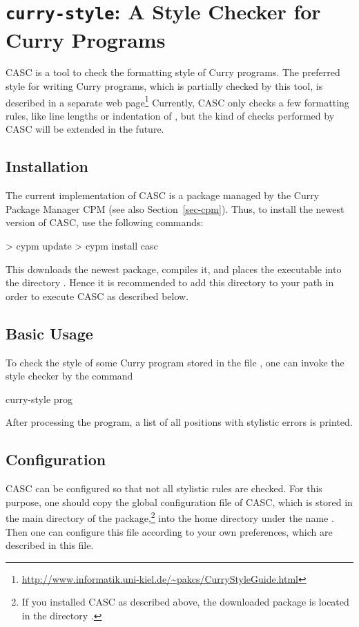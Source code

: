 \section{\texttt{curry-style}: A Style Checker for Curry Programs}
\label{sec-casc}

CASC
is a tool to check the formatting style of Curry programs.
The preferred style for writing Curry programs,
which is partially checked by this tool,
is described in a separate web page\footnote{%
\url{http://www.informatik.uni-kiel.de/~pakcs/CurryStyleGuide.html}}
Currently, CASC only checks a few formatting rules, like
line lengths or
indentation of , but the kind of checks
performed by CASC will be extended in the future.

\subsection{Installation}

The current implementation of CASC is a package
managed by the Curry Package Manager CPM
(see also Section~\ref{sec-cpm}).
Thus, to install the newest version of CASC, use the following commands:
%
\begin{curry}
> cypm update
> cypm install casc
\end{curry}
%
This downloads the newest package, compiles it, and places
the executable  into the directory .
Hence it is recommended to add this directory to your path
in order to execute CASC as described below.

\subsection{Basic Usage}

To check the style of some Curry program stored
in the file ,
one can invoke the style checker by
the command
%
\begin{curry}
curry-style prog
\end{curry}
%
After processing the program, a list of all positions
with stylistic errors is printed.


\subsection{Configuration}

CASC can be configured so that not all stylistic rules are checked.
For this purpose, one should copy the global configuration file
 of CASC,
which is stored in the main directory of the package,\footnote{%
If you installed CASC as described above,
the downloaded package is located in the directory
.}
into the home directory under the name .
Then one can configure this file according to your own preferences,
which are described in this file.

